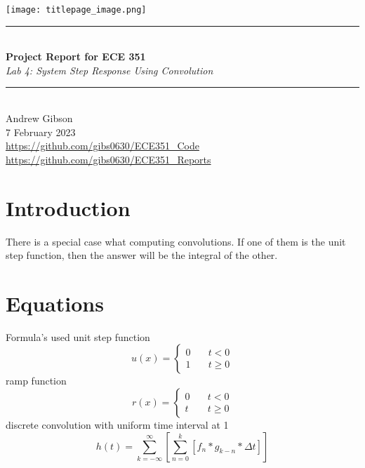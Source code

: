 \documentclass[12pt,a4paper]{article}
\newcommand{\HRule}{\rule{\linewidth}{0.5mm}}
\begin{document}
\begin{titlepage}
\begin{center}
\texttt{[image: titlepage\_image.png]}~\\[2cm]
\HRule \\[0.4cm]
{ \LARGE 
  \textbf{Project Report for ECE 351}\\[0.4cm]
  \emph{Lab 4: System Step Response Using Convolution}\\[0.4cm]
}
\HRule \\[1.5cm]
{ \large
  Andrew Gibson \\[0.1cm]
  7 February 2023\\[0.1cm]
  \url{https://github.com/gibs0630/ECE351\_Code}\\[0.1cm]
  \url{https://github.com/gibs0630/ECE351\_Reports}\\[0.1cm]
}
\vfill
{\large }
 
\end{center}
\end{titlepage}
\newpage
\tableofcontents
{}
\newpage
\setcounter{page}{1}
\section{Introduction}\label{sec:intro}
There is a special case what computing convolutions.  If one of them is the unit step function, then the answer will be the integral of the other.

\section{Equations}\label{sec:lit-rev}
Formula's used
unit step function
\[
u(x) = \left\{
        \begin{array}{ll}
            0 & \quad t < 0 \\
            1 & \quad t \geq 0
        \end{array}
    \right.
\]
ramp function
\[
r(x) = \left\{
        \begin{array}{ll}
            0 & \quad t < 0 \\
            t & \quad t \geq 0
        \end{array}
    \right.
\]
discrete convolution with uniform time interval at 1
\[h(t) = \sum_{k=-\infty}^{\infty} {\left [ \sum_{n=0}^{k} {\left [ f_n*g_{k-n}* \Delta t\right ]} \right ]}\]
\end{document}
